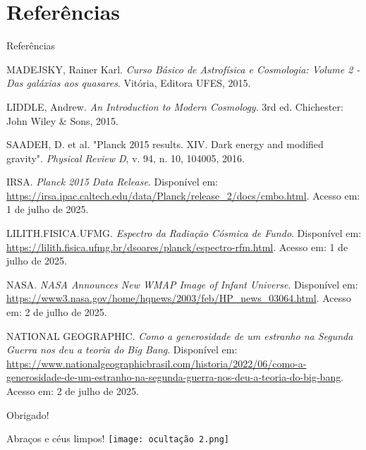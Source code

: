 \documentclass{beamer}
\begin{document}
\section{Referências}
\begin{frame}[allowframebreaks]{Referências}
    \nocite{*} %
    \begin{thebibliography}{99} %

        \tiny
        MADEJSKY, Rainer Karl. \textit{Curso Básico de Astrofísica e Cosmologia: Volume 2 - Das galáxias aos quasares}. Vitória, Editora UFES, 2015.

        LIDDLE, Andrew. \textit{An Introduction to Modern Cosmology}. 3rd ed. Chichester: John Wiley & Sons, 2015. %

        SAADEH, D. et al. "Planck 2015 results. XIV. Dark energy and modified gravity". \textit{Physical Review D}, v. 94, n. 10, 104005, 2016. %

        IRSA. \textit{Planck 2015 Data Release}. Disponível em: \url{https://irsa.ipac.caltech.edu/data/Planck/release_2/docs/cmbo.html}. Acesso em: 1 de julho de 2025. %

        LILITH.FISICA.UFMG. \textit{Espectro da Radiação Cósmica de Fundo}. Disponível em: \url{https://lilith.fisica.ufmg.br/dsoares/planck/espectro-rfm.html}. Acesso em: 1 de julho de 2025.

        NASA. \textit{NASA Announces New WMAP Image of Infant Universe}. Disponível em: \url{https://www3.nasa.gov/home/hqnews/2003/feb/HP_news_03064.html}. Acesso em: 2 de julho de 2025.

        NATIONAL GEOGRAPHIC. \textit{Como a generosidade de um estranho na Segunda Guerra nos deu a teoria do Big Bang}. Disponível em: \url{https://www.nationalgeographicbrasil.com/historia/2022/06/como-a-generosidade-de-um-estranho-na-segunda-guerra-nos-deu-a-teoria-do-big-bang}. Acesso em: 2 de julho de 2025.
        
    \end{thebibliography}
\end{frame}

\begin{frame}{Obrigado!}
    \begin{center}
        \Huge Abraços e céus limpos!
        \texttt{[image: ocultação 2.png]} %
    \end{center}
\end{frame}
\end{document}
